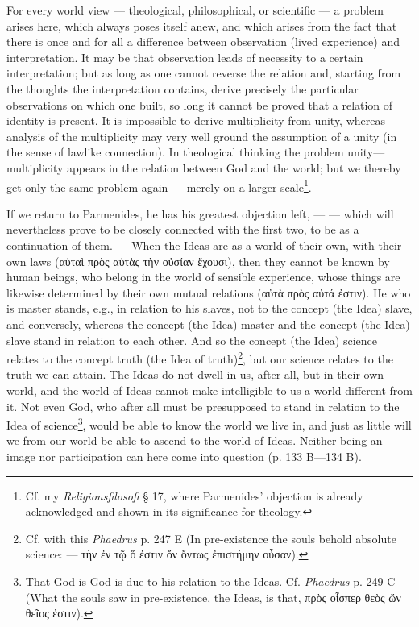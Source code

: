 \documentclass[12pt,a4paper,openany]{book}
\newcommand{\opage}[1]{\marginnote{\footnotesize\textit{[#1]}}}
\begin{document}
For every world view --- theological, philosophical, or
scientific --- a problem arises here, which
always poses itself anew, and which arises from the fact that there is once
and for all a difference between observation (lived experience) and interpretation.
It may be that observation leads of necessity to a
certain interpretation; but as long as one cannot reverse the relation
and, starting from the thoughts the interpretation contains, derive
precisely the particular observations on which one built, so long
it cannot be proved that a relation of identity is present.
It is impossible to derive multiplicity from unity, whereas
analysis of the multiplicity may very well ground the
\setcounter{footnote}{0}%
\opage{23}assumption of a unity (in the sense of lawlike connection).
In theological thinking the problem unity—
multiplicity appears in the relation between God and the world; but we
thereby get only the same problem again --- merely on a larger
scale\footnote[1]{Cf. my \textit{Religionsfilosofi} § 17, where Parmenides’ objection is already acknowledged and shown in its significance for theology.}. ---

If we return to Parmenides, he has his greatest
objection left, --- --- which will nevertheless prove to be closely
connected with the first two, to be as a continuation
of them. --- When the Ideas are as a world of their own,
with their own laws (αὐταὶ πρὸς αὐτὰς τὴν οὐσίαν ἔχουσι),
then they cannot be known by human beings, who belong
in the world of sensible experience, whose things are likewise
determined by their own mutual relations (αὐτὰ
πρὸς αὐτά ἐστιν). He who is master stands, e.g., in relation
to his slaves, not to the concept (the Idea) slave, and conversely,
whereas the concept (the Idea) master and the concept (the Idea)
slave stand in relation to each other. And so the concept
(the Idea) science relates to the concept truth (the Idea
of truth)\footnote[2]{Cf. with this \textit{Phaedrus} p. 247 E (In pre-existence the souls behold absolute science: --- τὴν ἐν τῷ ὅ ἐστιν ὄν ὄντως ἐπιστήμην οὖσαν).}, but our science relates to the
truth we can attain. The Ideas do not dwell in us, after all, but in their
own world, and the world of Ideas cannot make intelligible to us a world
different from it. Not even God, who after all
must be presupposed to stand in relation to the Idea of science\footnote[3]{That God is God is due to his relation to the Ideas. Cf. \textit{Phaedrus} p. 249 C (What the souls saw in pre-existence, the Ideas, is that, πρὸς οἷσπερ θεὸς ὤν θεῖος ἐστιν).},
would be able to know the world we live in, and just as little
will we from our world be able to ascend to the world of Ideas.
\setcounter{footnote}{0}%
\opage{24}Neither being an image nor participation can here
come into question (p. 133 B—134 B).
\end{document}
